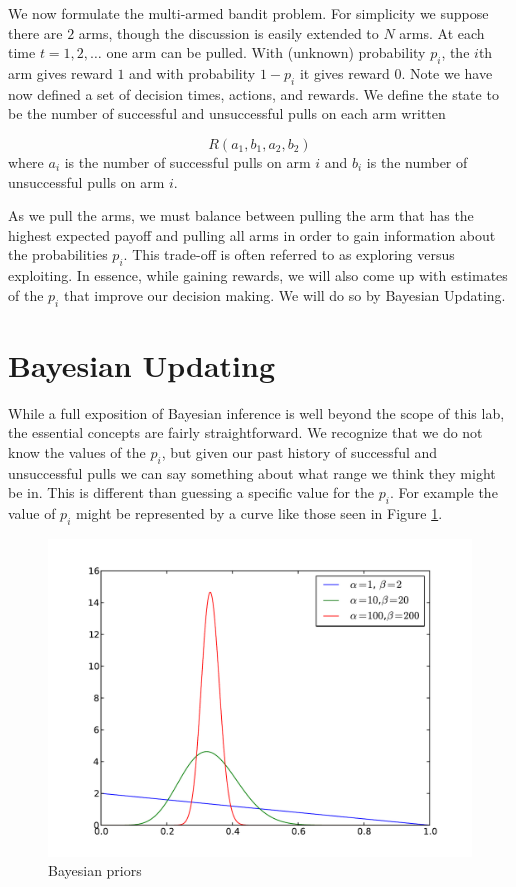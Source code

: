We now formulate the multi-armed bandit problem.  For simplicity we suppose there are $2$ arms, though the discussion is easily extended to $N$ arms.  At each time $t= 1,2,\ldots$ one arm can be pulled.  With (unknown) probability $p_i$, the $i$th arm gives reward $1$ and with probability $1-p_i$ it gives reward $0$.  Note we have now defined a set of decision times, actions, and rewards.  We define the state to be the number of successful and unsuccessful pulls on each arm written

\begin{equation}\label{state}
R(a_1,b_1,a_2,b_2)
\end{equation}
\noindent
where $a_i$ is the number of successful pulls on arm $i$ and $b_i$ is the number of unsuccessful pulls on arm $i$.

As we pull the arms, we must balance between pulling the arm that has the highest expected payoff and pulling all arms in order to gain information about the probabilities $p_i$.  This trade-off is often referred to as exploring versus exploiting.  In essence, while gaining rewards, we will also come up with estimates of the $p_i$ that improve our decision making.  We will do so by Bayesian Updating.

\section*{Bayesian Updating}
While a full exposition of Bayesian inference is well beyond the scope of this lab, the essential concepts are fairly straightforward.  We recognize that we do not know the values of the $p_i$, but given our past history of successful and unsuccessful pulls we can say something about what range we think they might be in. This is different than guessing a specific value for the $p_i$.  For example the value of $p_i$ might be represented by a curve like those seen in Figure \ref{fig:priors}.

\begin{figure}\label{fig:priors}
\begin{center}
        \includegraphics[scale=0.4]{./Algorithms/MarkDecProc/priors.pdf}
        \caption{Bayesian priors}
\end{center}
\end{figure}

